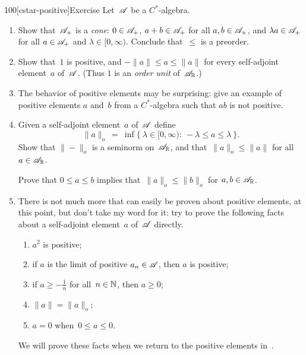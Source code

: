 \begin{parsec}{90}
\begin{point}{100}[cstar-positive]{Exercise}%
Let~$\mathscr{A}$ be a $C^*$-algebra.
\begin{enumerate}
\item
Show that~$\mathscr{A}_{+}$ is a \emph{cone}:
$0\in \mathscr{A}_{+}$,
$a+b\in \mathscr{A}_{+}$ for all $a,b\in\mathscr{A}_{+}$,
and
$\lambda a\in \mathscr{A}_{+}$  
for all $a\in \mathscr{A}_{+}$ and $\lambda\in [0,\infty)$.
Conclude that~$\leq$ is a preorder.
\item
Show that~$1$ is positive, and  $-\|a\|\leq a \leq \|a\|$
for every self-adjoint element~$a$ of~$\mathscr{A}$.
(Thus $1$ is an \emph{order unit} of~$\mathscr{A}_{\mathbb{R}}$.)
\item
The behavior of positive elements may be surprising:
give an example of positive elements $a$ and~$b$
from a $C^*$-algebra
such that $ab$ is not positive.
\item
Given a self-adjoint element~$a$ of~$\mathscr{A}$ define
\begin{equation*}
\|a\|_o \ = \ \inf\{\ \lambda\in[0,\infty)\colon \ 
-\lambda\leq a\leq \lambda\ \}.
\end{equation*}
Show that $\|-\|_o$ is a seminorm on~$\mathscr{A}_{\mathbb{R}}$,
and that~$\|a\|_o\leq \|a\|$
for all~$a\in\mathscr{A}_{\mathbb{R}}$.

Prove that $0\leq a\leq b$ implies that~$\|a\|_o\leq\|b\|_o$
for $a,b\in\mathscr{A}_{\mathbb{R}}$.

\item
There is not much more that can easily be
proven about positive elements, at this point,
but don't take my word for it:
try to prove the following facts
about a self-adjoint element~$a$ of~$\mathscr{A}$ directly.
\begin{enumerate}
\item $a^2$ is positive;
\item if $a$ is the limit of positive $a_n\in\mathscr{A}$,
then $a$ is positive;
\item if $a\geq -\frac{1}{n}$ for all~$n\in \mathbb{N}$, then $a\geq 0$;
\item  $\|a\|=\|a\|_o$;
\item $a=0$ when~$0\leq a\leq 0$.
\end{enumerate}
We will prove these facts
when we return to the positive elements in~.
\end{enumerate}%
\spacingfix{}%
\end{point}%
\end{parsec}%
